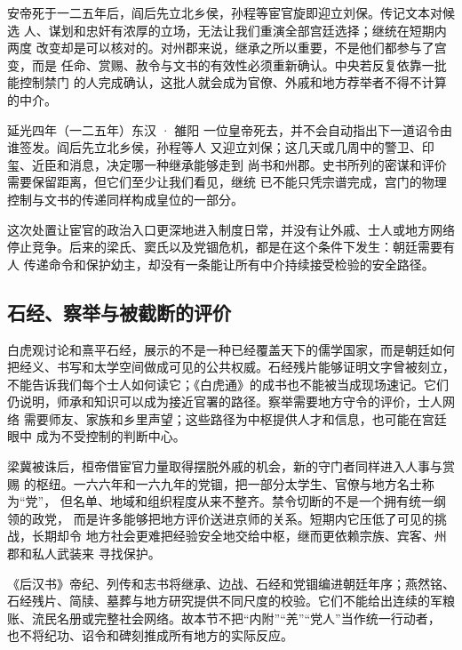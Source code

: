 安帝死于一二五年后，阎后先立北乡侯，孙程等宦官旋即迎立刘保。传记文本对候选
人、谋划和忠奸有浓厚的立场，无法让我们重演全部宫廷选择；继统在短期内两度
改变却是可以核对的。对州郡来说，继承之所以重要，不是他们都参与了宫变，而是
任命、赏赐、赦令与文书的有效性必须重新确认。中央若反复依靠一批能控制禁门
的人完成确认，这批人就会成为官僚、外戚和地方荐举者不得不计算的中介。

\begin{event}{}{延光四年（一二五年）}{东汉 · 雒阳}{}
一位皇帝死去，并不会自动指出下一道诏令由谁签发。阎后先立北乡侯，孙程等人
又迎立刘保；这几天或几周中的警卫、印玺、近臣和消息，决定哪一种继承能够走到
尚书和州郡。史书所列的密谋和评价需要保留距离，但它们至少让我们看见，继统
已不能只凭宗谱完成，宫门的物理控制与文书的传递同样构成皇位的一部分。

这次处置让宦官的政治入口更深地进入制度日常，并没有让外戚、士人或地方网络
停止竞争。后来的梁氏、窦氏以及党锢危机，都是在这个条件下发生：朝廷需要有人
传递命令和保护幼主，却没有一条能让所有中介持续接受检验的安全路径。
\end{event}

\subsection{石经、察举与被截断的评价}

白虎观讨论和熹平石经，展示的不是一种已经覆盖天下的儒学国家，而是朝廷如何
把经义、书写和太学空间做成可见的公共权威。石经残片能够证明文字曾被刻立，
不能告诉我们每个士人如何读它；《白虎通》的成书也不能被当成现场速记。它们
仍说明，师承和知识可以成为接近官署的路径。察举需要地方守令的评价，士人网络
需要师友、家族和乡里声望；这些路径为中枢提供人才和信息，也可能在宫廷眼中
成为不受控制的判断中心。

梁冀被诛后，桓帝借宦官力量取得摆脱外戚的机会，新的守门者同样进入人事与赏赐
的枢纽。一六六年和一六九年的党锢，把一部分太学生、官僚与地方名士称为“党”，
但名单、地域和组织程度从来不整齐。禁令切断的不是一个拥有统一纲领的政党，
而是许多能够把地方评价送进京师的关系。短期内它压低了可见的挑战，长期却令
地方社会更难把经验安全地交给中枢，继而更依赖宗族、宾客、州郡和私人武装来
寻找保护。

\begin{sourcenote}[中期东汉的材料怎样改变读法]
《后汉书》帝纪、列传和志书将继承、边战、石经和党锢编进朝廷年序；燕然铭、
石经残片、简牍、墓葬与地方研究提供不同尺度的校验。它们不能给出连续的军粮
账、流民名册或完整社会网络。故本节不把“内附”“羌”“党人”当作统一行动者，
也不将纪功、诏令和碑刻推成所有地方的实际反应。
\end{sourcenote}
